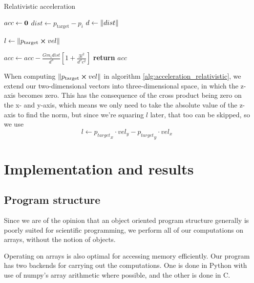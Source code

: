 \documentclass[a4paper]{article}
\begin{document}
\begin{algorithm}
\caption{Relativistic acceleration} \label{alg:acceleration_relativistic}
\begin{algorithmic}[1]
    \Statex {}
    \State $acc \gets \bf{0}$ 
            \State $dist \gets p_{\mathrm{target}} - p_{i}$
            \State $d \gets \norm{dist}$ 

            \State $l \gets \norm{p_{\mathrm{target}} \cross vel}$


            \State $acc \gets acc - \frac{G m_{i} dist}{d^3} \left[1 + \frac{3l^2}{d^2c^2}\right]$
        \EndIf
    \EndFor
    \State \textbf{return} $acc$
  \EndFunction
\end{algorithmic}
\end{algorithm}

When computing $\norm{p_{\mathrm{target}} \cross vel}$ in algorithm \vref{alg:acceleration_relativistic}, we extend our two-dimensional vectors into three-dimensional space, in which the z-axis becomes zero. This has the consequence of the cross product being zero on the x- and y-axis, which means we only need to take the absolute value of the z-axis to find the norm, but since we're squaring $l$ later, that too can be skipped, so we use
\begin{equation}
    l \gets {p_{target}}_{x}\cdot vel_y - {p_{target}}_{y}\cdot vel_x
\end{equation}



\section{Implementation and results}\label{sec:implementation_and_results}
\subsection{Program structure}
Since we are of the opinion that an object oriented program structure generally is poorly suited for scientific programming, we perform all of our computations on arrays, without the notion of objects.

Operating on arrays is also optimal for accessing memory efficiently. Our program has two backends for carrying out the computations. One is done in Python with use of numpy's array arithmetic where possible, and the other is done in C.
\end{document}
